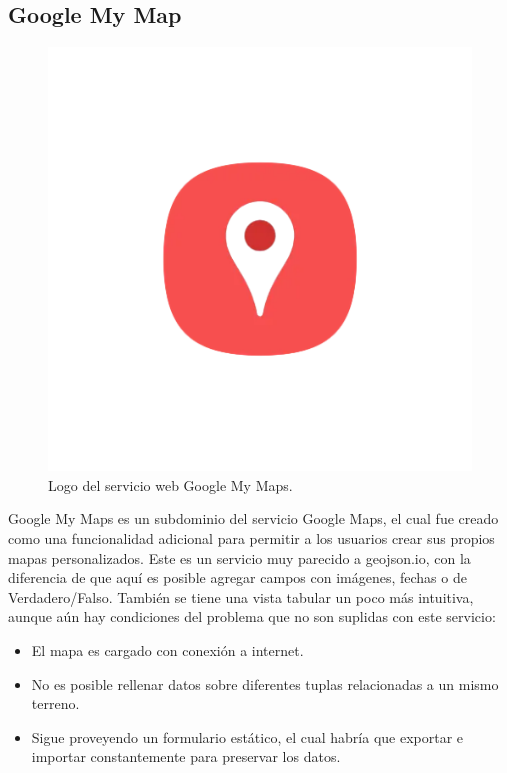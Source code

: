 \subsection{Google My Map}
\begin{figure}[h]
    \centering
    \includegraphics[scale=0.5]{Graphics/google_my_maps_logo.png}
    \caption{Logo del servicio web Google My Maps.}
    \label{fig:figura5}
\end{figure}
Google My Maps \cite{googleMyMaps} es un subdominio del servicio Google Maps, el cual fue creado como una funcionalidad adicional para permitir a los usuarios
crear sus propios mapas personalizados. Este es un servicio muy parecido a geojson.io, con la diferencia de que aquí es posible agregar campos con imágenes, fechas o de Verdadero/Falso.
También se tiene una vista tabular un poco más intuitiva, aunque aún hay condiciones del problema que no son suplidas con este servicio:
\begin{itemize}
    \item El mapa es cargado con conexión a internet.
    \item No es posible rellenar datos sobre diferentes tuplas relacionadas a un mismo terreno.
    \item Sigue proveyendo un formulario estático, el cual habría que exportar e importar constantemente para preservar los datos.
\end{itemize}
